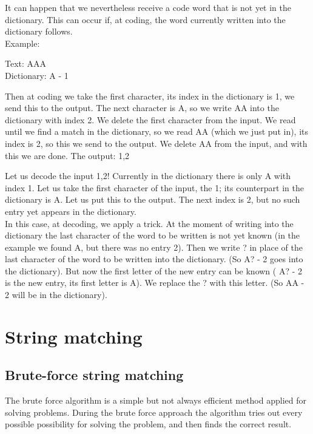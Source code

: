 \documentclass[margin=0px]{article}
\begin{document}
\begin{description}
        It can happen that we nevertheless receive a code word that is not yet in the dictionary. This can occur if, at coding, the word currently written into the dictionary follows.\\

        Example:

        Text: AAA\\
        Dictionary: A - 1

        Then at coding we take the first character, its index in the dictionary is 1, we send this to the output. The next character is A, so we write AA into the dictionary with index 2. We delete the first character from the input. We read until we find a match in the dictionary, so we read AA (which we just put in), its index is 2, so this we send to the output. We delete AA from the input, and with this we are done. The output: 1,2

        Let us decode the input 1,2! Currently in the dictionary there is only A with index 1. Let us take the first character of the input, the 1; its counterpart in the dictionary is A. Let us put this to the output. The next index is 2, but no such entry yet appears in the dictionary. \\

        In this case, at decoding, we apply a trick. At the moment of writing into the dictionary the last character of the word to be written is not yet known (in the example we found A, but there was no entry 2). Then we write ? in place of the last character of the word to be written into the dictionary. (So A? - 2 goes into the dictionary). But now the first letter of the new entry can be known ( A? - 2 is the new entry, its first letter is A). We replace the ? with this letter. (So AA - 2 will be in the dictionary).
\end{description}
\section{String matching}
\subsection{Brute-force string matching}
The brute force algorithm is a simple but not always efficient method applied for solving problems. During the brute force approach the algorithm tries out every possible possibility for solving the problem, and then finds the correct result.
\end{document}
